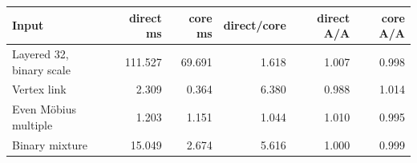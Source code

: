 \begin{center}
\small
\begin{tabular}{lrrrrr}
\toprule
Input & direct ms & core ms & direct/core & direct A/A & core A/A\\
\midrule
Layered 32, binary scale & 111.527 & 69.691 & 1.618 & 1.007 & 0.998\\
Vertex link & 2.309 & 0.364 & 6.380 & 0.988 & 1.014\\
Even M\"obius multiple & 1.203 & 1.151 & 1.044 & 1.010 & 0.995\\
Binary mixture & 15.049 & 2.674 & 5.616 & 1.000 & 0.999\\
\bottomrule
\end{tabular}
\end{center}
